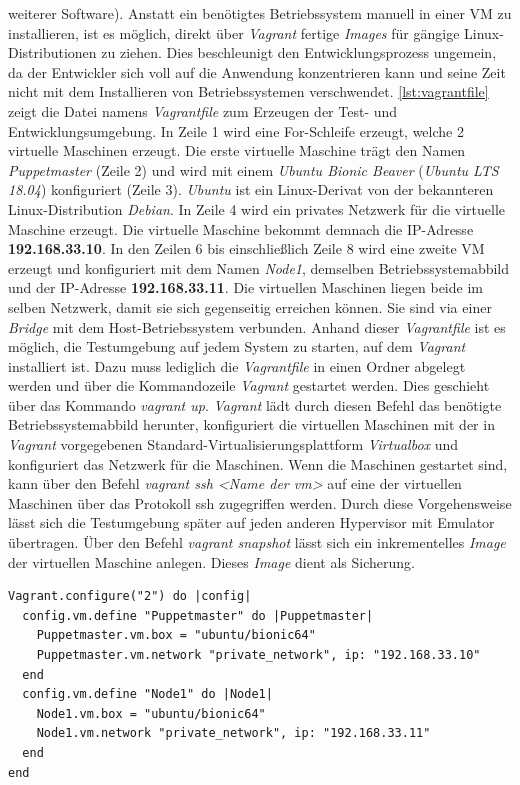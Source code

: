 \documentclass[titlepage]{report}
\begin{document}
weiterer Software). Anstatt
ein benötigtes Betriebssystem manuell in einer VM zu installieren, ist es
möglich, direkt über \emph{Vagrant} fertige \emph{Images} für gängige
Linux\hyp{}Distributionen zu ziehen. Dies beschleunigt den
Entwicklungsprozess ungemein, da der Entwickler sich voll auf die
Anwendung konzentrieren kann und seine Zeit nicht mit dem Installieren
von Betriebssystemen verschwendet. \autoref{lst:vagrantfile} zeigt
die Datei namens \emph{Vagrantfile} zum Erzeugen der Test\hyp{} und
Entwicklungsumgebung. In Zeile 1 wird eine For\hyp{}Schleife erzeugt,
welche 2 virtuelle Maschinen erzeugt. Die erste virtuelle Maschine trägt
den Namen \emph{Puppetmaster} (Zeile 2) und wird mit einem \emph{Ubuntu
Bionic Beaver} (\emph{Ubuntu LTS 18.04}) konfiguriert (Zeile 3). \emph{Ubuntu} ist
ein Linux\hyp{}Derivat von der bekannteren Linux\hyp{}Distribution
\emph{Debian}. In Zeile 4 wird ein privates Netzwerk für die virtuelle
Maschine erzeugt. Die virtuelle Maschine bekommt demnach die
IP\hyp{}Adresse \textbf{192.168.33.10}. In den Zeilen 6 bis
einschließlich Zeile 8 wird eine zweite VM erzeugt und konfiguriert mit
dem Namen \emph{Node1}, demselben Betriebssystemabbild und der
IP\hyp{}Adresse \textbf{192.168.33.11}. Die virtuellen Maschinen liegen
beide im selben Netzwerk, damit sie sich gegenseitig erreichen können.
Sie sind via einer \emph{Bridge} mit dem Host\hyp{}Betriebssystem verbunden.
Anhand dieser \emph{Vagrantfile} ist es möglich, die Testumgebung auf jedem System zu
starten, auf dem \emph{Vagrant} installiert ist. Dazu muss lediglich die
\emph{Vagrantfile} in einen Ordner abgelegt werden und über die
Kommandozeile \emph{Vagrant} gestartet werden. Dies geschieht über das
Kommando \emph{vagrant up}. \emph{Vagrant} lädt durch diesen Befehl das
benötigte Betriebssystemabbild herunter, konfiguriert die virtuellen
Maschinen mit der in \emph{Vagrant} vorgegebenen
Standard\hyp{}Virtualisierungsplattform \emph{Virtualbox} und
konfiguriert das Netzwerk für die Maschinen. Wenn die Maschinen
gestartet sind, kann über den Befehl \emph{vagrant ssh <Name der vm>} auf
eine der virtuellen Maschinen über das Protokoll \gls{ssh} zugegriffen werden.
Durch diese Vorgehensweise lässt sich die Testumgebung später auf jeden
anderen Hypervisor mit Emulator übertragen. Über den Befehl
\emph{vagrant snapshot} lässt sich ein inkrementelles \emph{Image} der
virtuellen Maschine anlegen. Dieses \emph{Image} dient als Sicherung.
\begin{minipage}{\linewidth}
\begin{lstlisting}[caption={Vagrantfile der Test- und Entwicklungsumgebung},label={lst:vagrantfile}]
Vagrant.configure("2") do |config|
  config.vm.define "Puppetmaster" do |Puppetmaster|
    Puppetmaster.vm.box = "ubuntu/bionic64"
    Puppetmaster.vm.network "private_network", ip: "192.168.33.10"
  end
  config.vm.define "Node1" do |Node1|
    Node1.vm.box = "ubuntu/bionic64"
    Node1.vm.network "private_network", ip: "192.168.33.11"
  end
end
\end{lstlisting}
\end{minipage}
\end{document}
